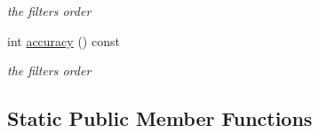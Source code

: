 \begin{DoxyCompactItemize}
\begin{DoxyCompactList}\small\item\em the filters order \end{DoxyCompactList}\item 
int \hyperlink{classow__core_1_1ScalarFiniteDifference_a502aa6a61c73529e731be0a0096414fd}{accuracy} () const \hypertarget{classow__core_1_1ScalarFiniteDifference_a502aa6a61c73529e731be0a0096414fd}{}\label{classow__core_1_1ScalarFiniteDifference_a502aa6a61c73529e731be0a0096414fd}

\begin{DoxyCompactList}\small\item\em the filters order \end{DoxyCompactList}\end{DoxyCompactItemize}
\subsection*{Static Public Member Functions}
